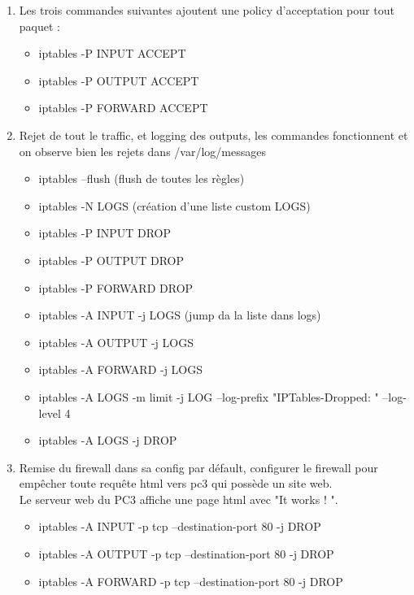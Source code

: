 \documentclass[a4paper,10pt,final,fleqn]{article}
\begin{document}
		\begin{enumerate}
			\item Les trois commandes suivantes ajoutent une policy d'acceptation pour tout paquet : \\

				\begin{itemize}
					\item iptables -P INPUT ACCEPT
					\item iptables -P OUTPUT ACCEPT
					\item iptables -P FORWARD ACCEPT
				\end{itemize}

			\item Rejet de tout le traffic, et logging des outputs, les commandes fonctionnent et on observe bien les rejets dans /var/log/messages \\

				\begin{itemize}
					\item iptables --flush (flush de toutes les règles)
					\item iptables -N LOGS (création d'une liste custom LOGS)
					\item iptables -P INPUT DROP
					\item iptables -P OUTPUT DROP
					\item iptables -P FORWARD DROP
					\item iptables -A INPUT -j LOGS (jump da la liste dans logs)
					\item iptables -A OUTPUT -j LOGS	
					\item iptables -A FORWARD -j LOGS
					\item iptables -A LOGS -m limit -j LOG --log-prefix "IPTables-Dropped: " --log-level 4
					\item iptables -A LOGS -j DROP
				\end{itemize}

			\item Remise du firewall dans sa config par défault, configurer le firewall pour empêcher toute requête html vers pc3 qui possède un site web. \\

			Le serveur web du PC3 affiche une page html avec "It works ! ".\\

				\begin{itemize}
					\item iptables -A INPUT -p tcp --destination-port 80 -j DROP
					\item iptables -A OUTPUT -p tcp --destination-port 80 -j DROP
					\item iptables -A FORWARD -p tcp --destination-port 80 -j DROP
				\end{itemize}


\end{enumerate}
\end{document}
